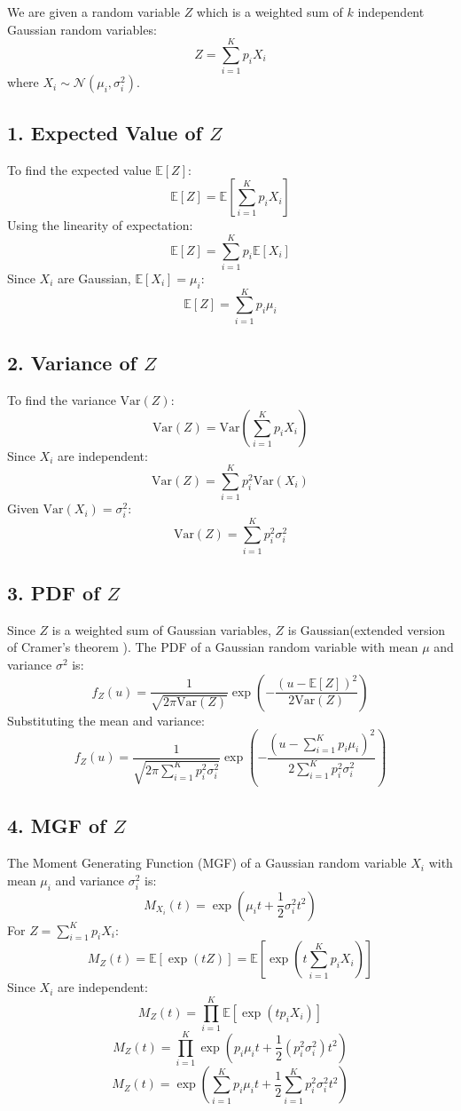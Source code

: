 \documentclass{article}
\begin{document}
We are given a random variable \( Z \) which is a weighted sum of \( k \) independent Gaussian random variables:
\[
Z = \sum_{i=1}^K p_i X_i
\]
where \( X_i \sim \mathcal{N}(\mu_i, \sigma_i^2) \).

\subsection*{1. Expected Value of \( Z \)}

To find the expected value \( \mathbb{E}[Z] \):
\[
\mathbb{E}[Z] = \mathbb{E} \left[ \sum_{i=1}^K p_i X_i \right]
\]
Using the linearity of expectation:
\[
\mathbb{E}[Z] = \sum_{i=1}^K p_i \mathbb{E}[X_i]
\]
Since \( X_i \) are Gaussian, \( \mathbb{E}[X_i] = \mu_i \):
\[
\mathbb{E}[Z] = \sum_{i=1}^K p_i \mu_i
\]

\subsection*{2. Variance of \( Z \)}

To find the variance \( \text{Var}(Z) \):
\[
\text{Var}(Z) = \text{Var} \left( \sum_{i=1}^K p_i X_i \right)
\]
Since \( X_i \) are independent:
\[
\text{Var}(Z) = \sum_{i=1}^K p_i^2 \text{Var}(X_i)
\]
Given \( \text{Var}(X_i) = \sigma_i^2 \):
\[
\text{Var}(Z) = \sum_{i=1}^K p_i^2 \sigma_i^2
\]

\subsection*{3. PDF of \( Z \)}

Since \( Z \) is a weighted sum of Gaussian variables, \( Z \) is Gaussian(extended version of Cramer's theorem ). The PDF of a Gaussian random variable with mean \( \mu \) and variance \( \sigma^2 \) is:
\[
f_Z(u) = \frac{1}{\sqrt{2 \pi \text{Var}(Z)}} \exp \left( -\frac{(u - \mathbb{E}[Z])^2}{2 \text{Var}(Z)} \right)
\]
Substituting the mean and variance:
\[
f_Z(u) = \frac{1}{\sqrt{2 \pi \sum_{i=1}^K p_i^2 \sigma_i^2}} \exp \left( -\frac{(u - \sum_{i=1}^K p_i \mu_i)^2}{2 \sum_{i=1}^K p_i^2 \sigma_i^2} \right)
\]

\subsection*{4. MGF of \( Z \)}

The Moment Generating Function (MGF) of a Gaussian random variable \( X_i \) with mean \( \mu_i \) and variance \( \sigma_i^2 \) is:
\[
M_{X_i}(t) = \exp \left( \mu_i t + \frac{1}{2} \sigma_i^2 t^2 \right)
\]
For \( Z = \sum_{i=1}^K p_i X_i \):
\[
M_Z(t) = \mathbb{E} \left[ \exp(tZ) \right] = \mathbb{E} \left[ \exp \left( t \sum_{i=1}^K p_i X_i \right) \right]
\]
Since \( X_i \) are independent:
\[
M_Z(t) = \prod_{i=1}^K \mathbb{E} \left[ \exp \left( t p_i X_i \right) \right]
\]
\[
M_Z(t) = \prod_{i=1}^K \exp \left( p_i \mu_i t + \frac{1}{2} (p_i^2 \sigma_i^2) t^2 \right)
\]
\[
M_Z(t) = \exp \left( \sum_{i=1}^K p_i \mu_i t + \frac{1}{2} \sum_{i=1}^K p_i^2 \sigma_i^2 t^2 \right)
\]
\end{document}

